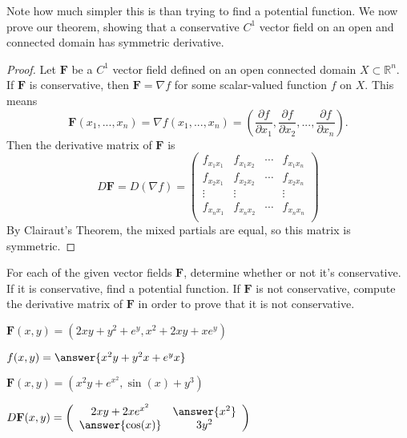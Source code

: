 \documentclass{ximera}
\begin{document}
Note how much simpler this is than trying to find a potential function. We now prove our theorem, showing that a conservative $C^1$ vector field on an open and connected domain has symmetric derivative.

\begin{proof}
Let $\mathbf{F}$ be a $C^1$ vector field defined on an open connected domain $X\subset\mathbb{R}^n$. If $\mathbf{F}$ is  conservative, then $\mathbf{F}=\nabla f$ for some scalar-valued function $f$ on $X$. This means
\[
\mathbf{F}(x_1,...,x_n) = \nabla f(x_1,...,x_n) = \left(\dfrac{\partial f}{\partial x_1}, \dfrac{\partial f}{\partial x_2}, ...,\dfrac{\partial f}{\partial x_n}\right).
\]
Then the derivative matrix of $\mathbf{F}$ is
\[
D\mathbf{F} = D(\nabla f) = \left(\begin{array}{cccc}
f_{x_1x_1} & f_{x_1x_2} & \cdots & f_{x_1x_n}\\
f_{x_2x_1} & f_{x_2x_2} & \cdots & f_{x_2x_n}\\
\vdots & \vdots & & \vdots\\
f_{x_nx_1} & f_{x_nx_2} & \cdots & f_{x_nx_n}\\
\end{array}\right)
\]
By Clairaut's Theorem, the mixed partials are equal, so this matrix is symmetric.
\end{proof}

For each of the given vector fields $\mathbf{F}$, determine whether or not it's conservative. If it is conservative, find a potential function. If $\mathbf{F}$ is not conservative, compute the derivative matrix of $\mathbf{F}$ in order to prove that it is not conservative.

\begin{problem}
$\mathbf{F}(x,y) = (2xy+y^2+e^y, x^2+2xy+xe^y)$
\begin{multipleChoice}
\end{multipleChoice}
\begin{problem}
$f(x,y)=\answer{x^2y+y^2x+e^yx}$
\end{problem}
\end{problem}

\begin{problem}
$\mathbf{F}(x,y) = (x^2y+e^{x^2},\sin(x)+y^3)$
\begin{multipleChoice}
\end{multipleChoice}
\begin{problem}
$D\mathbf{F}(x,y) = \left(\begin{array}{cc}2xy+2xe^{x^2}&\answer{x^2}\\\answer{\cos(x)}&3y^2\end{array}\right)$
\end{problem}
\end{problem}
\end{document}
